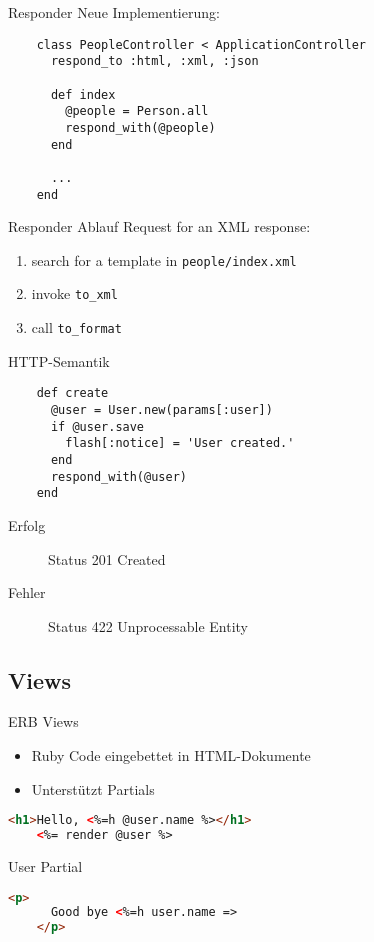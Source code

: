 \begin{frame}[fragile]{Responder}
  Neue Implementierung:
  \begin{lstlisting}
    class PeopleController < ApplicationController
      respond_to :html, :xml, :json

      def index
        @people = Person.all
        respond_with(@people)
      end

      ...
    end
  \end{lstlisting}
\end{frame}

\begin{frame}{Responder Ablauf}
  Request for an XML response:
  \begin{enumerate}
    \item search for a template in \lstinline|people/index.xml|
    \item invoke \lstinline|to_xml|
    \item call \lstinline|to_format|
  \end{enumerate}
\end{frame}

\begin{frame}[fragile]{HTTP-Semantik}
  \begin{lstlisting}
    def create
      @user = User.new(params[:user])
      if @user.save
        flash[:notice] = 'User created.'
      end
      respond_with(@user)
    end
  \end{lstlisting}

  \begin{description}
    \item[Erfolg] Status 201 Created
    \item[Fehler] Status 422 Unprocessable Entity
  \end{description}
\end{frame}

\subsection{Views}

\begin{frame}[fragile]{ERB Views}
  \begin{itemize}
    \item Ruby Code eingebettet in HTML-Dokumente
    \item Unterstützt Partials
  \end{itemize}

  \begin{lstlisting}[language=HTML]
    <h1>Hello, <%=h @user.name %></h1>
    <%= render @user %>
  \end{lstlisting}

  User Partial
  \begin{lstlisting}[language=HTML]
    <p>
      Good bye <%=h user.name =>
    </p>
  \end{lstlisting}
\end{frame}


